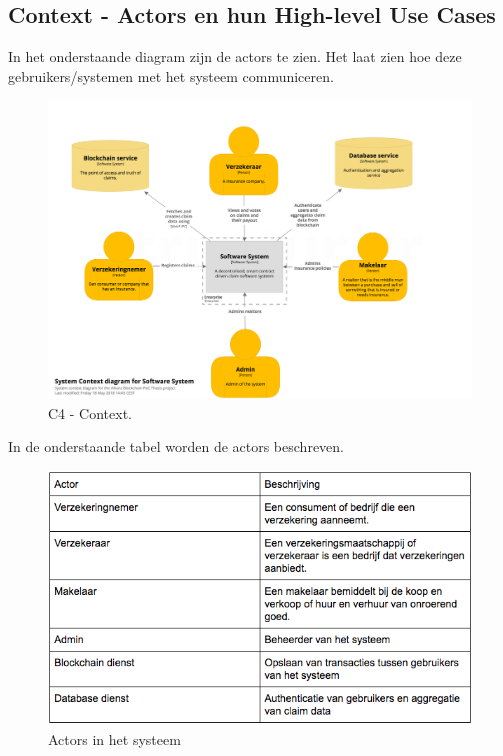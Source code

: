 \subsection{Context - Actors en hun High-level Use Cases}
In het onderstaande diagram zijn de actors te zien. Het laat zien hoe deze gebruikers/systemen met het systeem communiceren.
\begin{figure}[h!]
    \begin{center}
        \includegraphics[width=\paperwidth-200]{images/context}
        \caption{C4 - Context.}
        \label{fig:c4Context}
    \end{center}
\end{figure}

In de onderstaande tabel worden de actors beschreven.
\begin{figure}[h!]
    \begin{center}
        \includegraphics[width=\paperwidth-250]{images/actors}
        \caption{Actors in het systeem}
        \label{fig:actors}
    \end{center}
\end{figure}

